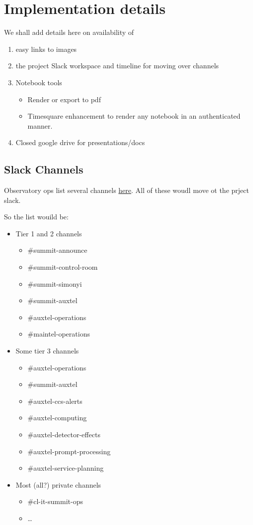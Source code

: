 \section{Implementation details} \label{sec:implementation}

We shall add details here on availability of

\begin{enumerate}
\item easy links to images
\item the project Slack workspace and timeline for moving over channels
\item Notebook tools

\begin{itemize}
\item Render or export to pdf
\item Timesquare enhancement to render any notebook in an authenticated manner.

\end{itemize}
\item Closed google drive for presentations/docs
\end{enumerate}

\subsection{Slack Channels}

Observatory ops list several channels \href{https://obs-ops.lsst.io/Daytime-Nighttime-Interactions/slack-channel-usage.html}{here}.
All of these woudl move ot the prject slack.

So the list wouild be:

\begin{itemize}
\item Tier 1 and 2 channels
\begin{itemize}
\item \#summit-announce
\item \#summit-control-room
\item \#summit-simonyi
\item \#summit-auxtel
\item \#auxtel-operations
\item \#maintel-operations
\end{itemize}
\item Some tier 3 channels
\begin{itemize}
\item \#auxtel-operations
\item \#summit-auxtel
\item \#auxtel-ccs-alerts
\item \#auxtel-computing
\item \#auxtel-detector-effects
\item \#auxtel-prompt-processing
\item \#auxtel-service-planning
\end{itemize}

\item Most (all?) private channels
\begin{itemize}
\item \#cl-it-summit-ops
\item \ldots
\end{itemize}
\end{itemize}
